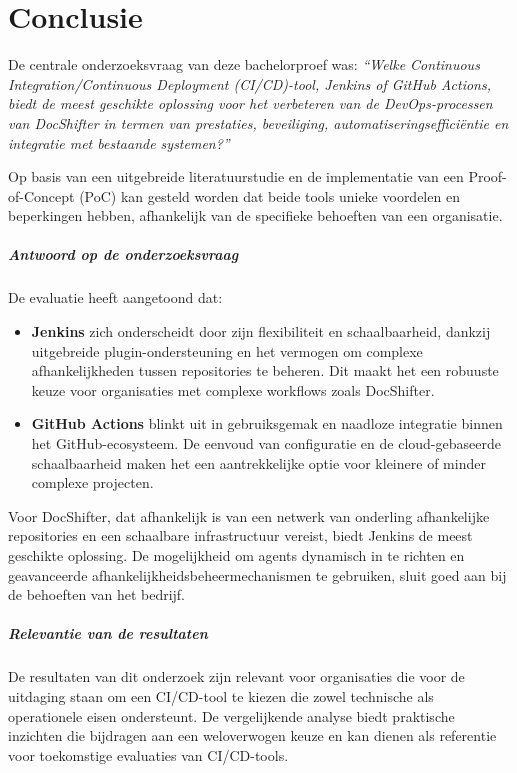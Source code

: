 
\chapter{Conclusie}
\label{ch:conclusie}

De centrale onderzoeksvraag van deze bachelorproef was: 
\emph{“Welke Continuous Integration/Continuous Deployment (CI/CD)-tool, Jenkins of GitHub Actions, biedt de meest geschikte oplossing voor het verbeteren van de DevOps-processen van DocShifter in termen van prestaties, beveiliging, automatiseringsefficiëntie en integratie met bestaande systemen?”} 

Op basis van een uitgebreide literatuurstudie en de implementatie van een Proof-of-Concept (PoC) kan gesteld worden dat beide tools unieke voordelen en beperkingen hebben, afhankelijk van de specifieke behoeften van een organisatie.

\paragraph{Antwoord op de onderzoeksvraag}
De evaluatie heeft aangetoond dat:
\begin{itemize}
    \item \textbf{Jenkins} zich onderscheidt door zijn flexibiliteit en schaalbaarheid, dankzij uitgebreide plugin-ondersteuning en het vermogen om complexe afhankelijkheden tussen repositories te beheren. Dit maakt het een robuuste keuze voor organisaties met complexe workflows zoals DocShifter.
    \item \textbf{GitHub Actions} blinkt uit in gebruiksgemak en naadloze integratie binnen het GitHub-ecosysteem. De eenvoud van configuratie en de cloud-gebaseerde schaalbaarheid maken het een aantrekkelijke optie voor kleinere of minder complexe projecten.
\end{itemize}

Voor DocShifter, dat afhankelijk is van een netwerk van onderling afhankelijke repositories en een schaalbare infrastructuur vereist, biedt Jenkins de meest geschikte oplossing. De mogelijkheid om agents dynamisch in te richten en geavanceerde afhankelijkheidsbeheermechanismen te gebruiken, sluit goed aan bij de behoeften van het bedrijf.

\paragraph{Relevantie van de resultaten}
De resultaten van dit onderzoek zijn relevant voor organisaties die voor de uitdaging staan om een CI/CD-tool te kiezen die zowel technische als operationele eisen ondersteunt. De vergelijkende analyse biedt praktische inzichten die bijdragen aan een weloverwogen keuze en kan dienen als referentie voor toekomstige evaluaties van CI/CD-tools.

